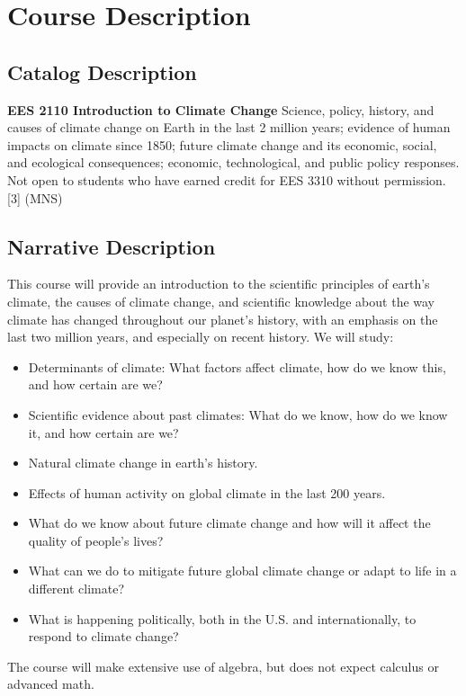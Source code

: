 \documentclass[11pt]{jgsyllabus}\usepackage[]{graphicx}\usepackage[]{xcolor}
\begin{document}
\section[Description]{Course Description}
\subsection{Catalog Description}

\textbf{EES 2110 Introduction to Climate Change}
Science, policy, history, and causes of climate change on Earth in the last
2 million years; evidence of human impacts on climate since 1850; future
climate change and its economic, social, and ecological consequences; economic,
technological, and public policy responses.
Not open to students who have earned credit for EES 3310 without permission.
[3] (MNS)

\subsection{Narrative Description}

This course will provide an introduction to the scientific principles of
earth's climate, the causes of climate change, and scientific knowledge about
the way climate has changed throughout our planet's history, with an emphasis
on the last two million years, and especially on recent history. We will study:
\begin{itemize}
  \item Determinants of climate: What factors affect climate, how do we know
    this, and how certain are we?
  \item Scientific evidence about past climates: What do we know, how do we know
    it, and how certain are we?
  \item Natural climate change in earth's history.
  \item Effects of human activity on global climate in the last 200 years.
  \item What do we know about future climate change and how will it affect the
    quality of people's lives?
  \item What can we do to mitigate future global climate change or adapt to life
    in a different climate?
  \item What is happening politically, both in the U.S. and internationally, to
    respond to climate change?
\end{itemize}

The course will make extensive use of algebra, but does not expect calculus or
advanced math.
\end{document}
